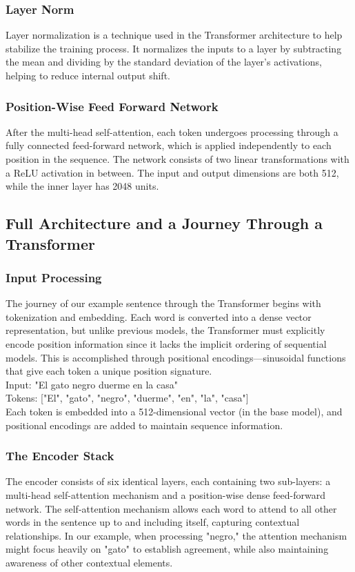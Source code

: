 \subsubsection{Layer Norm}
Layer normalization is a technique used in the Transformer architecture to help stabilize the training process. It normalizes the inputs to a layer by subtracting the mean and dividing by the standard deviation of the layer's activations, helping to reduce internal output shift.

\subsubsection{Position-Wise Feed Forward Network}
After the multi-head self-attention, each token undergoes processing through a fully connected feed-forward network, which is applied independently to each position in the sequence. The network consists of two linear transformations with a ReLU activation in between. The input and output dimensions are both 512, while the inner layer has 2048 units.

\subsection{Full Architecture and a Journey Through a Transformer}

\subsubsection{Input Processing}
The journey of our example sentence through the Transformer begins with tokenization and embedding. Each word is converted into a dense vector representation, but unlike previous models, the Transformer must explicitly encode position information since it lacks the implicit ordering of sequential models. This is accomplished through positional encodings—sinusoidal functions that give each token a unique position signature. \\

Input: "El gato negro duerme en la casa" \\ 

Tokens: ["El", "gato", "negro", "duerme", "en", "la", "casa"] \\

Each token is embedded into a 512-dimensional vector (in the base model), and positional encodings are added to maintain sequence information.

\subsubsection{The Encoder Stack}
The encoder consists of six identical layers, each containing two sub-layers: a multi-head self-attention mechanism and a position-wise dense feed-forward network. The self-attention mechanism allows each word to attend to all other words in the sentence up to and including itself, capturing contextual relationships. In our example, when processing "negro," the attention mechanism might focus heavily on "gato" to establish agreement, while also maintaining awareness of other contextual elements. 

